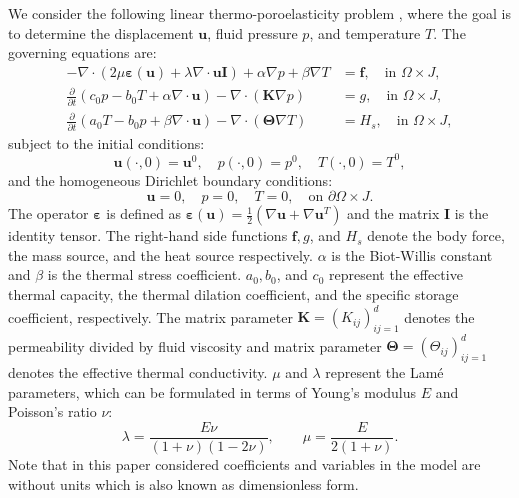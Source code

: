 \documentclass{article}
\numberwithin{equation}{section}
\begin{document}
We consider the following linear thermo-poroelasticity problem \cite{brun2018upscaling}, where the goal is to determine the displacement \(\bm{u}\), fluid pressure \(p\), and temperature \(T\). The governing equations are:  
\begin{equation}\label{TP_model}
\begin{aligned} 
    -\nabla \cdot (2\mu \bm{\varepsilon}(\bm{u}) + \lambda \nabla \cdot \bm{u} \bm{I}) + \alpha \nabla p + \beta \nabla T &= \bm{f}, \quad \text{in } \Omega \times J, \\
    \frac{\partial}{\partial t}(c_0 p - b_0 T + \alpha \nabla \cdot \bm{u}) - \nabla \cdot (\bm{K} \nabla p) &= g, \quad \text{in } \Omega \times J, \\
    \frac{\partial}{\partial t}(a_0 T - b_0 p + \beta \nabla \cdot \bm{u}) - \nabla \cdot (\bm{\Theta} \nabla T) &=  H_{s}, \quad \text{in } \Omega \times J,
\end{aligned}
\end{equation}
subject to the initial conditions:
\begin{equation}\label{I_C}
\bm{u}(\cdot, 0) = \bm{u}^0, \quad p(\cdot, 0) = p^0, \quad T(\cdot, 0) = T^0,
\end{equation}
and the homogeneous Dirichlet boundary conditions:
\begin{equation}\label{B_C}
\bm{u} = 0, \quad p = 0, \quad T = 0, \quad \text{on } \partial \Omega \times J.
\end{equation}
The operator $\bm\varepsilon$ is defined as $\bm\varepsilon(\bm u)=\frac{1}{2}(\nabla\bm u+\nabla\bm u^T)$ and
the matrix $\bm I$  is the identity tensor. The right-hand side functions $\bm f,g$, and $ H_{s}$ denote the body force, the mass source, and the heat source respectively. $\alpha$ is the Biot-Willis constant and $\beta$ is the thermal stress coefficient. $a_0,b_0$, and $c_0$ represent the effective thermal capacity, the thermal dilation coefficient, and the specific storage coefficient, respectively. The matrix parameter $\bm K = (K_{ij})^d_{ij=1}$ 
denotes the permeability divided by fluid viscosity and matrix parameter  $\bm\Theta = (\Theta_{ij})^d_{ij=1}$
denotes the effective thermal conductivity. $\mu$ and $\lambda$ represent the Lam\'e parameters, which can be formulated in terms of Young's modulus $E$ and Poisson's ratio $\nu$:
\[
\lambda=  \frac{E\nu}{(1+\nu)(1-2\nu)},\qquad \mu=\frac{E}{2(1+\nu)}.
\]
Note that in this paper considered coefficients and variables in the model are without units which is also known as dimensionless form.
\end{document}

